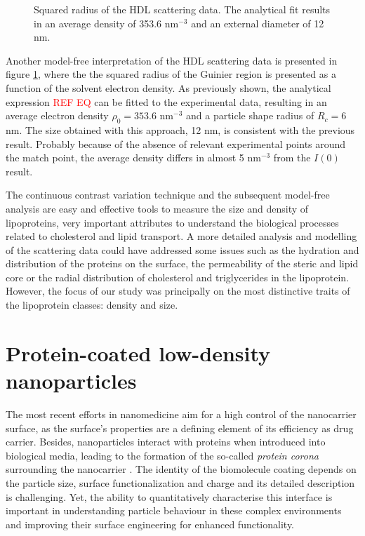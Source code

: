 \begin{figure}
	\centering
		
		\caption{Squared radius of the HDL scattering data. The analytical fit results in an average density of 353.6 nm$^{-3}$ and an external diameter of 12 nm.}
		\label{fig:HDLGuinierRadius}
\end{figure}

Another model-free interpretation of the HDL scattering data is presented in figure \ref{fig:HDLGuinierRadius}, where the the squared radius of the Guinier region is presented as a function of the solvent electron density. As previously shown, the analytical expression \textcolor{red}{REF EQ} can be fitted to the experimental data, resulting in an average electron density $\rho_0=353.6$ nm$^{-3}$ and a particle shape radius of $R_c=6$ nm. The size obtained with this approach, 12 nm, is consistent with the previous result. Probably because of the absence of relevant experimental points around the match point, the average density differs in almost 5 nm$^{-3}$ from the $I(0)$ result.

The continuous contrast variation technique and the subsequent model-free analysis are easy and effective tools to measure the size and density of lipoproteins, very important attributes to understand the biological processes related to cholesterol and lipid transport. A more detailed analysis and modelling of the scattering data could have addressed some issues such as the hydration and distribution of the proteins on the surface, the permeability of the steric and lipid core or the radial distribution of cholesterol and triglycerides in the lipoprotein. However, the focus of our study was principally on the most distinctive traits of the lipoprotein classes: density and size.


\section{Protein-coated low-density nanoparticles}
The most recent efforts in nanomedicine aim for a high control of the nanocarrier surface, as the surface's properties are a defining element of its efficiency as drug carrier. Besides, nanoparticles interact with proteins when introduced into biological media, leading to the formation of the so-called \emph{protein corona} surrounding the nanocarrier \cite{cedervall_understanding_2007,monopoli_physicalchemical_2011,casals_time_2010}. The identity of the biomolecule coating depends on the particle size, surface functionalization and charge \cite{lundqvist_nanoparticle_2008,tenzer_rapid_2013,gessner_functional_2003} and its detailed description is challenging. Yet, the ability to quantitatively characterise this interface is important in understanding particle behaviour in these complex environments and improving their surface engineering for enhanced functionality.

